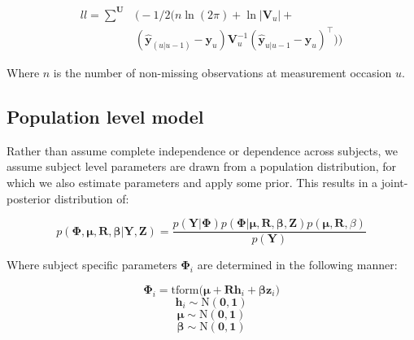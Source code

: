 \documentclass[nojss]{jss}\usepackage[]{graphicx}\usepackage[]{color}
\newcommand{\vect}[1]{\boldsymbol{\mathbf{#1}}}
\begin{document}
\begin{equation}
\begin{split}
ll=\sum^{\vect{U}} & \bigg(   -1/2 (n \ln (2 \pi) + \ln \big| \vect{V}_{u} \big| + \\
& ( \hat{\vect{y}}_{(u|u-1)} - \vect{y}_u )  \vect{V}^{-1}_{u}   ( \hat{\vect{y}}_{u|u-1} - \vect{y}_u )^\top) \bigg)
\end{split}
\end{equation}

Where $n$ is the number of non-missing observations at measurement occasion $u$. 

\subsection{Population level model}
Rather than assume complete independence or dependence across subjects, we assume subject level parameters are drawn from a population distribution, for which we also estimate parameters and apply some prior. This results in a joint-posterior distribution of:

\begin{equation}
p(\vect{\Phi},\vect{\mu},\vect{R},\vect{\beta} | \vect{Y}, \vect{Z}) =  \frac{ p(\vect{Y} | \vect{\Phi}) p(\vect{\Phi} | \vect{\mu},\vect{R},\vect{\beta}, \vect{Z}) p(\vect{\mu},\vect{R},\beta)}{p(\vect{Y})}
\end{equation}

Where subject specific parameters $\vect{\Phi}_i$ are determined in the following manner:

\begin{equation}
\label{eq:subjectparams}
\vect{\Phi}_i = \text{tform} \bigg(\vect{\mu} + \vect{Rh}_i + \vect{\beta} \vect{z}_i \bigg)
\end{equation}  
\begin{equation}
\vect{h}_i \sim \mathrm{N}(\vect{0,1})
\end{equation}  
\begin{equation}
\vect{\mu} \sim \mathrm{N}(\vect{0,1})
\end{equation}  
\begin{equation}
\vect{\beta} \sim \mathrm{N}(\vect{0,1})
\end{equation}  
\end{document}
